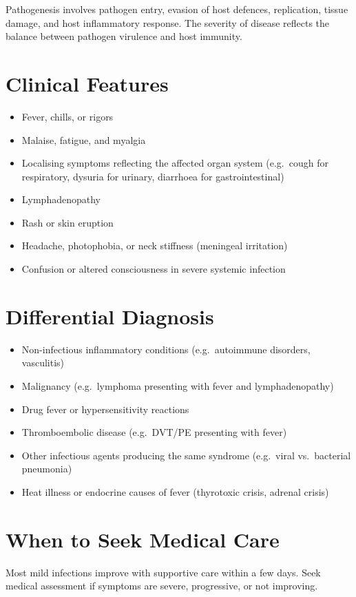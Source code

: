 Pathogenesis involves pathogen entry, evasion of host defences, replication, tissue damage, and host inflammatory response. The severity of disease reflects the balance between pathogen virulence and host immunity.

\section*{Clinical Features}
\begin{itemize}
    \item Fever, chills, or rigors
    \item Malaise, fatigue, and myalgia
    \item Localising symptoms reflecting the affected organ system (e.g.\ cough for respiratory, dysuria for urinary, diarrhoea for gastrointestinal)
    \item Lymphadenopathy
    \item Rash or skin eruption
    \item Headache, photophobia, or neck stiffness (meningeal irritation)
    \item Confusion or altered consciousness in severe systemic infection
\end{itemize}

\section*{Differential Diagnosis}
\begin{itemize}
    \item Non-infectious inflammatory conditions (e.g.\ autoimmune disorders, vasculitis)
    \item Malignancy (e.g.\ lymphoma presenting with fever and lymphadenopathy)
    \item Drug fever or hypersensitivity reactions
    \item Thromboembolic disease (e.g.\ DVT/PE presenting with fever)
    \item Other infectious agents producing the same syndrome (e.g.\ viral vs.\ bacterial pneumonia)
    \item Heat illness or endocrine causes of fever (thyrotoxic crisis, adrenal crisis)
\end{itemize}

\section*{When to Seek Medical Care}
Most mild infections improve with supportive care within a few days. Seek medical assessment if symptoms are severe, progressive, or not improving.

